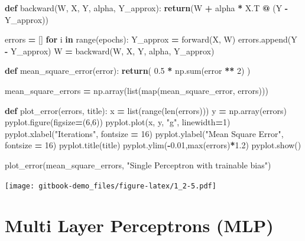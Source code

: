 \documentclass[
]{book}
\newenvironment{Shaded}{\begin{snugshade}}{\end{snugshade}}
\newcommand{\BuiltInTok}[1]{#1}
\newcommand{\ControlFlowTok}[1]{\textcolor[rgb]{0.13,0.29,0.53}{\textbf{#1}}}
\newcommand{\DecValTok}[1]{\textcolor[rgb]{0.00,0.00,0.81}{#1}}
\newcommand{\FloatTok}[1]{\textcolor[rgb]{0.00,0.00,0.81}{#1}}
\newcommand{\KeywordTok}[1]{\textcolor[rgb]{0.13,0.29,0.53}{\textbf{#1}}}
\newcommand{\NormalTok}[1]{#1}
\newcommand{\OperatorTok}[1]{\textcolor[rgb]{0.81,0.36,0.00}{\textbf{#1}}}
\newcommand{\StringTok}[1]{\textcolor[rgb]{0.31,0.60,0.02}{#1}}
\begin{document}
\begin{Shaded}
\begin{Highlighting}[]
\KeywordTok{def}\NormalTok{ backward(W, X, Y, alpha, Y\_approx):}
    \ControlFlowTok{return}\NormalTok{(W }\OperatorTok{+}\NormalTok{ alpha }\OperatorTok{*}\NormalTok{ X.T }\OperatorTok{@}\NormalTok{ (Y }\OperatorTok{{-}}\NormalTok{ Y\_approx))}
  
  
\NormalTok{errors }\OperatorTok{=}\NormalTok{ []}
\ControlFlowTok{for}\NormalTok{ i }\KeywordTok{in} \BuiltInTok{range}\NormalTok{(epochs):}
\NormalTok{  Y\_approx }\OperatorTok{=}\NormalTok{ forward(X, W)}
\NormalTok{  errors.append(Y }\OperatorTok{{-}}\NormalTok{ Y\_approx)}
\NormalTok{  W }\OperatorTok{=}\NormalTok{ backward(W, X, Y, alpha, Y\_approx)}
  
  
  
\KeywordTok{def}\NormalTok{ mean\_square\_error(error):}
  \ControlFlowTok{return}\NormalTok{( }\FloatTok{0.5} \OperatorTok{*}\NormalTok{ np.}\BuiltInTok{sum}\NormalTok{(error }\OperatorTok{**} \DecValTok{2}\NormalTok{) )}


\NormalTok{mean\_square\_errors }\OperatorTok{=}\NormalTok{ np.array(}\BuiltInTok{list}\NormalTok{(}\BuiltInTok{map}\NormalTok{(mean\_square\_error, errors)))}


\KeywordTok{def}\NormalTok{ plot\_error(errors, title):}
\NormalTok{  x }\OperatorTok{=} \BuiltInTok{list}\NormalTok{(}\BuiltInTok{range}\NormalTok{(}\BuiltInTok{len}\NormalTok{(errors)))}
\NormalTok{  y }\OperatorTok{=}\NormalTok{ np.array(errors)}
\NormalTok{  pyplot.figure(figsize}\OperatorTok{=}\NormalTok{(}\DecValTok{6}\NormalTok{,}\DecValTok{6}\NormalTok{))}
\NormalTok{  pyplot.plot(x, y, }\StringTok{"g"}\NormalTok{, linewidth}\OperatorTok{=}\DecValTok{1}\NormalTok{)}
\NormalTok{  pyplot.xlabel(}\StringTok{"Iterations"}\NormalTok{, fontsize }\OperatorTok{=} \DecValTok{16}\NormalTok{)}
\NormalTok{  pyplot.ylabel(}\StringTok{"Mean Square Error"}\NormalTok{, fontsize }\OperatorTok{=} \DecValTok{16}\NormalTok{)}
\NormalTok{  pyplot.title(title)}
\NormalTok{  pyplot.ylim(}\OperatorTok{{-}}\FloatTok{0.01}\NormalTok{,}\BuiltInTok{max}\NormalTok{(errors)}\OperatorTok{*}\FloatTok{1.2}\NormalTok{)}
\NormalTok{  pyplot.show()}
  
  
\NormalTok{plot\_error(mean\_square\_errors, }\StringTok{"Single Perceptron with trainable bias"}\NormalTok{)}
\end{Highlighting}
\end{Shaded}

\texttt{[image: gitbook-demo\_files/figure-latex/1\_2-5.pdf]}

\hypertarget{multi-layer-perceptrons-mlp}{%
\chapter{Multi Layer Perceptrons (MLP)}\label{multi-layer-perceptrons-mlp}}
\end{document}

